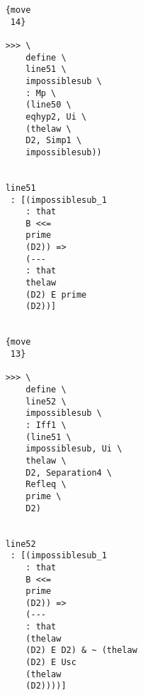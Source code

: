 \documentclass[12pt]{article}
\begin{document}
\begin{verbatim}
                                          {move 
                                           14}

                                          >>> \
                                              define \
                                              line51 \
                                              impossiblesub \
                                              : Mp \
                                              (line50 \
                                              eqhyp2, Ui \
                                              (thelaw \
                                              D2, Simp1 \
                                              impossiblesub))


                                          line51 
                                           : [(impossiblesub_1 
                                              : that 
                                              B <<= 
                                              prime 
                                              (D2)) => 
                                              (--- 
                                              : that 
                                              thelaw 
                                              (D2) E prime 
                                              (D2))]


                                          {move 
                                           13}

                                          >>> \
                                              define \
                                              line52 \
                                              impossiblesub \
                                              : Iff1 \
                                              (line51 \
                                              impossiblesub, Ui \
                                              thelaw \
                                              D2, Separation4 \
                                              Refleq \
                                              prime \
                                              D2)


                                          line52 
                                           : [(impossiblesub_1 
                                              : that 
                                              B <<= 
                                              prime 
                                              (D2)) => 
                                              (--- 
                                              : that 
                                              (thelaw 
                                              (D2) E D2) & ~ (thelaw 
                                              (D2) E Usc 
                                              (thelaw 
                                              (D2))))]



\end{verbatim}
\end{document}

